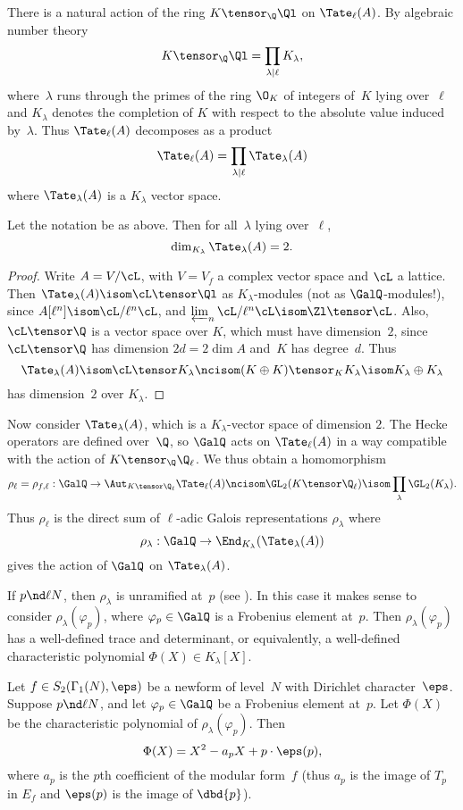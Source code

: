 \documentclass{report}
\begin{document}
There is a natural action of the ring  $K\tensor_{\Q}\Ql$ on
$\Tate_{\ell}(A)$.  By algebraic number theory
\[
  K\tensor_{\Q}\Ql = \prod_{\lambda\mid\ell} K_{\lambda},
\]
where~$\lambda$ runs through the primes of the ring $\O_K$ of
integers of~$K$ lying over~$\ell$ and $K_\lambda$ denotes the
completion of $K$ with respect to the absolute value induced
by~$\lambda$. Thus $\Tate_{\ell}(A)$ decomposes as a product
\[
  \Tate_{\ell}(A)=\prod_{\lambda\mid \ell}\Tate_{\lambda}(A)
\]
where $\Tate_{\lambda}(A)$ is a $K_{\lambda}$ vector space.
\begin{lemma}\label{lem:dimtate}
Let the notation be as above. Then for all~$\lambda$ lying
over~$\ell$,
\[
  \dim_{K_{\lambda}} \Tate_{\lambda}(A) = 2.
\]
\end{lemma}
\begin{proof}
Write $A=V/\cL$, with $V=V_f$ a complex vector space and $\cL$ a
lattice.  Then $\Tate_{\lambda}(A) \isom  \cL\tensor\Ql$ as
$K_\lambda$-modules (not as $\GalQ$-modules!), since
$A[\ell^n]\isom \cL/\ell^n\cL$, and $\varprojlim_{n}
\cL/\ell^n\cL\isom \Zl\tensor\cL$.  Also, $\cL\tensor\Q$ is a
vector space over $K$, which must have dimension~$2$, since
$\cL\tensor\Q$ has dimension $2d =2\dim A$ and~$K$ has degree~$d$.
Thus
\[
 \Tate_\lambda(A) \isom \cL\tensor K_\lambda \ncisom
        (K \oplus{} K) \tensor_K K_{\lambda}
        \isom K_{\lambda} \oplus K_{\lambda}
\]
has dimension~$2$ over $K_{\lambda}$.
\end{proof}

Now consider $\Tate_{\lambda}(A)$, which is a $K_{\lambda}$-vector
space of dimension $2$. The Hecke operators are defined over~$\Q$,
so $\GalQ$ acts on $\Tate_{\ell}(A)$ in a way compatible with the
action of $K\tensor_{\Q}\Q_{\ell}$. We thus obtain a homomorphism
\[
 \rho_{\ell}=\rho_{f,\ell}:\GalQ\to\Aut_{K\tensor\Q_{\ell}}\Tate_{\ell}(A)
             \ncisom \GL_2(K\tensor\Q_{\ell})
             \isom \prod_{\lambda}\GL_2(K_{\lambda}).
\]
Thus $\rho_{\ell}$ is the direct sum of $\ell$-adic Galois
representations $\rho_{\lambda}$ where
\[
 \rho_{\lambda}:\GalQ\to\End_{K_{\lambda}}(\Tate_{\lambda}(A))
\]
gives the action of $\GalQ$ on $\Tate_{\lambda}(A)$.

If $p\nd \ell{}N$, then $\rho_{\lambda}$ is unramified at~$p$ (see
\cite[Thm.~1]{serre-tate}). In this case it makes sense to
consider $\rho_{\lambda}(\varphi_p)$, where $\varphi_p\in\GalQ$ is
a Frobenius element at~$p$. Then $\rho_{\lambda}(\varphi_p)$ has a
well-defined trace and determinant, or equivalently, a well-defined
characteristic polynomial $\Phi(X) \in K_{\lambda}[X]$.
\begin{theorem}\label{thm:shimura_rep}
Let $f\in S_2(\Gamma_1(N),\eps)$ be a newform of level~$N$ with
Dirichlet character~$\eps$. Suppose $p\nd\ell{}N$, and let
$\varphi_p\in\GalQ$ be a Frobenius element at~$p$.  Let $\Phi(X)$
be the characteristic polynomial of $\rho_{\lambda}(\varphi_p)$.
Then
\[
   \Phi(X)=X^2 - a_p X + p\cdot \eps(p),
\]
where $a_p$ is the $p$th coefficient of the modular form~$f$ (thus
$a_p$ is the image of $T_p$ in $E_f$ and $\eps(p)$ is the image
of $\dbd{p}$).
\end{theorem}
\end{document}
